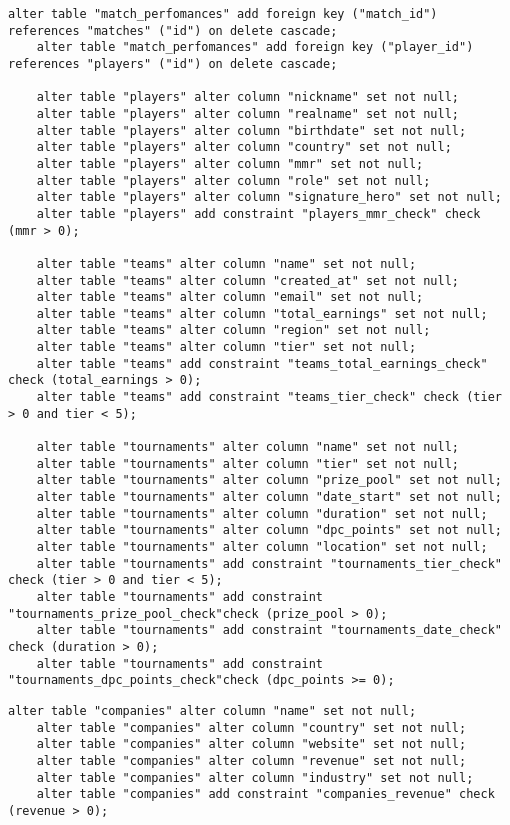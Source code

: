 \begin{appendices}
\clearpage

\begin{lstlisting}[caption={Сценарий создания ограничений в базе данных (часть 2)}]
	alter table "match_perfomances" add foreign key ("match_id") references "matches" ("id") on delete cascade;
	alter table "match_perfomances" add foreign key ("player_id") references "players" ("id") on delete cascade;
	
	alter table "players" alter column "nickname" set not null;
	alter table "players" alter column "realname" set not null;
	alter table "players" alter column "birthdate" set not null;
	alter table "players" alter column "country" set not null;
	alter table "players" alter column "mmr" set not null;
	alter table "players" alter column "role" set not null;
	alter table "players" alter column "signature_hero" set not null;
	alter table "players" add constraint "players_mmr_check" check (mmr > 0);
	
	alter table "teams" alter column "name" set not null;
	alter table "teams" alter column "created_at" set not null;
	alter table "teams" alter column "email" set not null;
	alter table "teams" alter column "total_earnings" set not null;
	alter table "teams" alter column "region" set not null;
	alter table "teams" alter column "tier" set not null;
	alter table "teams" add constraint "teams_total_earnings_check" check (total_earnings > 0);
	alter table "teams" add constraint "teams_tier_check" check (tier > 0 and tier < 5);
	
	alter table "tournaments" alter column "name" set not null;
	alter table "tournaments" alter column "tier" set not null;
	alter table "tournaments" alter column "prize_pool" set not null;
	alter table "tournaments" alter column "date_start" set not null;
	alter table "tournaments" alter column "duration" set not null;
	alter table "tournaments" alter column "dpc_points" set not null;
	alter table "tournaments" alter column "location" set not null;
	alter table "tournaments" add constraint "tournaments_tier_check" check (tier > 0 and tier < 5);
	alter table "tournaments" add constraint "tournaments_prize_pool_check"check (prize_pool > 0);
	alter table "tournaments" add constraint "tournaments_date_check" check (duration > 0);
	alter table "tournaments" add constraint "tournaments_dpc_points_check"check (dpc_points >= 0);
\end{lstlisting}

\clearpage

\begin{lstlisting}[caption={Сценарий создания ограничений в базе данных (часть 3)}]	
	alter table "companies" alter column "name" set not null;
	alter table "companies" alter column "country" set not null;
	alter table "companies" alter column "website" set not null;
	alter table "companies" alter column "revenue" set not null;
	alter table "companies" alter column "industry" set not null;
	alter table "companies" add constraint "companies_revenue" check (revenue > 0);
	

\end{lstlisting}
\end{appendices}
